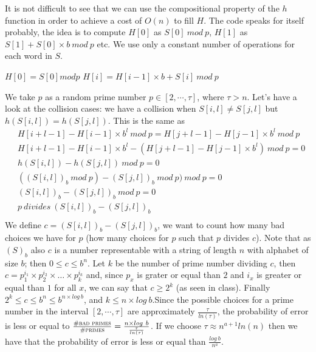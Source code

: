 \documentclass[a4paper]{article}
\begin{document}
It is not difficult to see that we can use the compositional property of the $h$ function in order to achieve a cost of $O(n)$ to fill $H$.
The code speaks for itself probably, the idea is to compute $H[0]$ as $S[0]\ mod\ p$, $H[1]$ as $S[1] + S[0] \times b\ mod\ p$ etc.
We use only a constant number of operations for each word in $S$.
\begin{algorithmic}
\State $H[0] = S[0] mod p$
	\State $H[i] = H[i-1] \times b + S[i]\ mod\ p$
\EndFor
\end{algorithmic}
We take $p$ as a random prime number $p\in [2,\cdots,\tau]$, where $\tau > n$.
Let's have a look at the collision cases: we have a collision when $S[i,l] \neq S[j,l]$ but $h(S[i,l]) = h(S[j,l])$.
This is the same as 
\begin{align*}				
&H[i + l - 1] - H[i - 1] \times b^l \ mod\ p = H[j + l - 1] - H[j - 1] \times b^l \ mod\ p \\
&H[i + l - 1] - H[i - 1] \times b^l - (H[j + l - 1] - H[j - 1] \times b^l) \ mod\ p = 0 \\
&h(S[i,l]) - h(S[j,l])\ mod\ p = 0 \\
&((S[i,l])_b\ mod\ p) - (S[j,l])_b\ mod\ p)\ mod\ p = 0 \\
&(S[i,l])_b - (S[j,l])_b\ mod\ p = 0 \\
&p\ divides\ (S[i,l])_b - (S[j,l])_b \\
\end{align*}
We define $c = (S[i,l])_b - (S[j,l])_b$, we want to count how many bad choices we have for $p$ (how many choices for $p$ such that $p$ divides $c$). 
Note that as $(S)_b$ also $c$ is a number representable with a string of length $n$ with alphabet of size $b$; then $0 \leq c \leq b^n$.
Let $k$ be the number of prime number dividing $c$, then $c = p_1^{i_1} \times p_2^{i_2} \times \dots \times p_k^{i_k}$ and, since $p_x$ is grater or equal than $2$ and $i_x$ is greater or equal than $1$ for all $x$, we can say that $c \geq 2^k$ (as seen in class).
Finally $2^k \leq c \leq b^n \leq b^{n \times log\ b}$, and $k \leq n \times log\ b$.Since the possible choices for a prime number in the interval $[2,\cdots,\tau]$ are approximately $\frac{\tau}{ln(\tau)}$, the probability of error is less or equal to $\frac{\textsc{\#bad primes}}{\textsc{\#primes}}= \frac{n \times log\ b}{\frac{\tau}{ln(\tau)}}$. If we choose $\tau \approx n^{a+1} ln(n)$ then we have that the probability of error is less or equal than $\frac{log\ b}{n^a}$.
\end{document}

